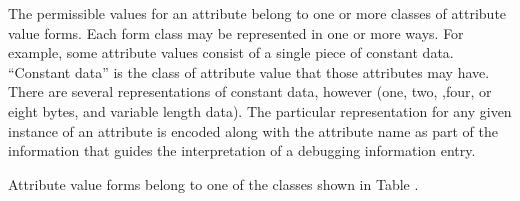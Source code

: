 The permissible values
for an attribute belong to one or more classes of attribute
value forms.  
Each form class may be represented in one or more ways. 
For example, some attribute values consist
of a single piece of constant data. 
``Constant data''
is the class of attribute value that those attributes may have. 
There are several representations of constant data,
however (one, two, ,four, or eight bytes, and variable length
data). 
The particular representation for any given instance
of an attribute is encoded along with the attribute name as
part of the information that guides the interpretation of a
debugging information entry.  

Attribute value forms belong
to one of the classes shown in Table .

